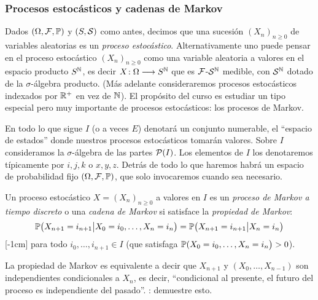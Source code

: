 \subsubsection{Procesos estocásticos y cadenas de Markov}

Dados $(\Omega,\mathcal{F},\mathbb{P})$ y $(S,\mathcal{S})$ como antes, decimos que una sucesión $(X_n)_{n\geq0}$ de variables aleatorias es un \emph{proceso estocástico}.
Alternativamente uno puede pensar en el proceso estocástico $(X_n)_{n\geq0}$ como una variable aleatoria a valores en el espacio producto $S^{\mathbb{N}}$, es decir $X\!:\Omega\longrightarrow S^{\mathbb{N}}$ que es $\mathcal{F}$-$\mathcal{S}^{\mathbb{N}}$ medible, con $\mathcal{S}^{\mathbb{N}}$ dotado de la $\sigma$-álgebra producto.
\lsep
(Más adelante consideraremos procesos estocásticos indexados por $\mathbb{R}^+$ en vez de $\mathbb{N}$).
\lsep
El propósito del curso es estudiar un tipo especial pero muy importante de procesos estocásticos: los procesos de Markov.

\vs

En todo lo que sigue $I$ (o a veces $E$) denotará un conjunto numerable, el ``espacio de estados'' donde nuestros procesos estocásticos tomarán valores.
Sobre $I$ consideramos la $\sigma$-álgebra de las partes $\mathcal{P}(I)$.
Los elementos de $I$ los denotaremos típicamente por $i,j,k$ o $x,y,z$.
Detrás de todo lo que haremos habrá un espacio de probabilidad fijo $(\Omega,\mathcal{F},\mathbb{P})$, que solo invocaremos cuando sea necesario.

\begin{defn}
Un proceso estocástico $X=(X_n)_{n\geq0}$ a valores en $I$ es un \emph{proceso de Markov a tiempo discreto} o una \emph{cadena de Markov} si satisface la \emph{propiedad de Markov}:
\begin{equation}\label{eq:propMarkov}
\mathbb{P}\big(X_{n+1}=i_{n+1}\big|X_0=i_0,\dotsc,X_{n}=i_{n}\big)=\mathbb{P}\big(X_{n+1}=i_{n+1}\big|X_{n}=i_{n}\big)
\end{equation}[-1cm]
para todo $i_0,\dotsc,i_{n+1}\in I$ (que satisfaga $\mathbb{P}(X_0=i_0,\dotsc,X_{n}=i_{n}\big)>0$).
\end{defn}

\begin{rem}
La propiedad de Markov es equivalente a decir que $X_{n+1}$ y $(X_0,\dotsc,X_{n-1})$ son independientes condicionales a $X_n$, es decir, ``condicional al presente, el futuro del proceso es independiente del pasado''.
\uexer: demuestre esto.
\end{rem}


